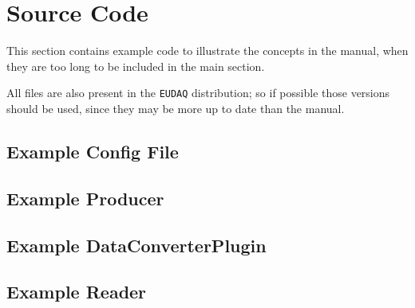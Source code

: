 \section{Source Code}
This section contains example code to illustrate the concepts in the manual,
when they are too long to be included in the main section.

All files are also present in the \texttt{EUDAQ} distribution;
so if possible those versions should be used, since they may be more up to date than the manual.

\subsection{Example Config File}\label{sec:ExampleConfig}
\newpage

\subsection{Example Producer}\label{sec:ExampleProducer}
\newpage

\subsection{Example DataConverterPlugin}\label{sec:ExampleConverter}
\newpage

%

%

\subsection{Example Reader}\label{sec:ExampleReader}
\newpage

